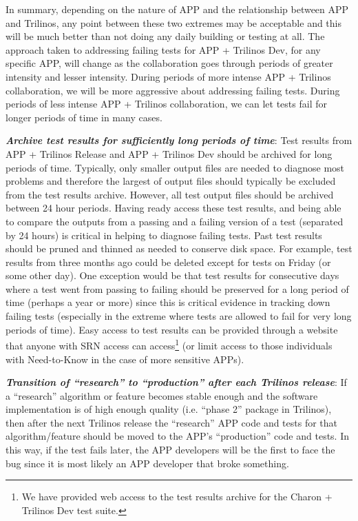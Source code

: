 \documentclass[pdf,ps2pdf,11pt]{SANDreport}
\begin{document}
In summary, depending on the nature of APP and the relationship between APP
and Trilinos, any point between these two extremes may be acceptable and this
will be much better than not doing any daily building or testing at all.  The
approach taken to addressing failing tests for APP + Trilinos Dev, for any
specific APP, will change as the collaboration goes through periods of greater
intensity and lesser intensity.  During periods of more intense APP + Trilinos
collaboration, we will be more aggressive about addressing failing tests.
During periods of less intense APP + Trilinos collaboration, we can let tests
fail for longer periods of time in many cases.

{}\textit{\textbf{Archive test results for sufficiently long periods of
time}}: Test results from APP + Trilinos Release and APP + Trilinos Dev should
be archived for long periods of time.  Typically, only smaller output files
are needed to diagnose most problems and therefore the largest of output files
should typically be excluded from the test results archive.  However, all test
output files should be archived between 24 hour periods.  Having ready access
these test results, and being able to compare the outputs from a passing and a
failing version of a test (separated by 24 hours) is critical in helping to
diagnose failing tests.  Past test results should be pruned and thinned as
needed to conserve disk space.  For example, test results from three months
ago could be deleted except for tests on Friday (or some other day).  One
exception would be that test results for consecutive days where a test went
from passing to failing should be preserved for a long period of time (perhaps
a year or more) since this is critical evidence in tracking down failing tests
(especially in the extreme where tests are allowed to fail for very long
periods of time).  Easy access to test results can be provided through a
website that anyone with SRN access can access\footnote{We have provided web
access to the test results archive for the Charon + Trilinos Dev test suite.} 
(or limit access to those individuals with Need-to-Know in the case of more
sensitive APPs).

{}\textit{\textbf{Transition of ``research'' to ``production'' after each
Trilinos release}}: If a ``research'' algorithm or feature becomes stable
enough and the software implementation is of high enough quality (i.e. ``phase
2'' package in Trilinos), then after the next Trilinos release the
``research'' APP code and tests for that algorithm/feature should be moved to
the APP's ``production'' code and tests.  In this way, if the test fails
later, the APP developers will be the first to face the bug since it is most
likely an APP developer that broke something.
\end{document}
